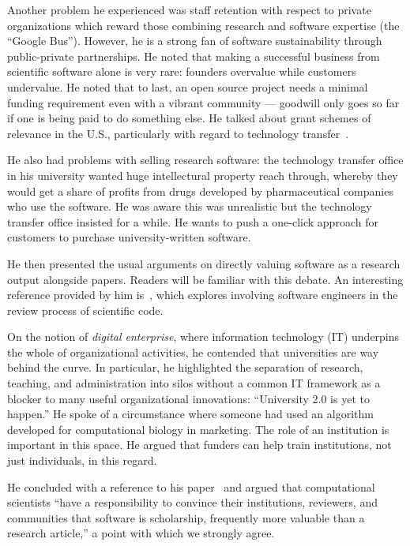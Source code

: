 \documentclass[11pt, oneside]{amsart}
\begin{document}
Another problem he experienced was staff retention with respect to
private organizations which reward those combining research and
software expertise (the ``Google Bus''). However, he is a strong fan
of software sustainability through public-private partnerships. He
noted that making a successful business from scientific software alone
is very rare: founders overvalue while customers undervalue. He noted
that to last, an open source project needs a minimal funding
requirement even with a vibrant community --- goodwill only goes so
far if one is being paid to do something else.  He talked about grant
schemes of relevance in the U.S., particularly with regard to
technology transfer~\cite{sbir-web, fased-web}.

He also had problems with selling research software: the technology
transfer office in his university wanted huge intellectural property
reach through, whereby they would get a share of profits from drugs
developed by pharmaceutical companies who use the software.  He was
aware this was unrealistic but the technology transfer office insisted
for a while. He wants to push a one-click approach for customers to
purchase university-written software.

He then presented the usual arguments on directly valuing software as
a research output alongside papers. Readers will be familiar with this
debate.  An interesting reference provided by him
is~\cite{peer-review-code}, which explores involving software
engineers in the review process of scientific code.

On the notion of \emph{digital enterprise}, where information
technology (IT) underpins the whole of organizational activities, he
contended that universities are way behind the curve. In
particular, he highlighted the separation of research, teaching, and
administration into silos without a common IT framework as a blocker
to many useful organizational innovations: ``University 2.0 is yet to
happen.'' He spoke of a circumstance where someone had used an
algorithm developed for computational biology in marketing.
The role of an institution is important in this space. He argued that
funders can help train institutions, not just individuals, in this regard.

He concluded with a reference to his paper~\cite{bourne_ten} and
argued that computational scientists ``have a responsibility to
convince their institutions, reviewers, and communities that software is
scholarship, frequently
more valuable than a research article,'' a point with which we strongly agree.
\end{document}
